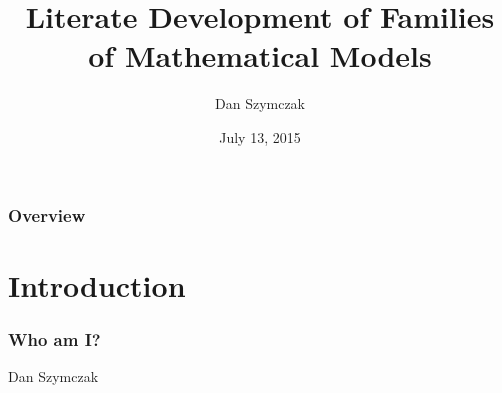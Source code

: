 \documentclass{beamer}
\title[\pgfuseimage{logo}]  %
{Literate Development of Families of Mathematical Models}
\author[Slide \thepage~of \pageref{TotPages}] %
{Dan Szymczak}
\institute[McMaster University] %
{
  Computing and Software Department\\
  Faculty of Engineering\\
  McMaster University
}
\date[] %
{July 13, 2015}
\begin{document}
\begin{frame}

\titlepage

\end{frame}


\begin{frame}

\frametitle{Overview}
\tableofcontents


\end{frame}


\section[Introduction]{Introduction}




\begin{frame}

\frametitle{Who am I?}

Dan Szymczak

\vspace{0.5cm}
\hspace{1cm}
\end{frame}

\end{document}
